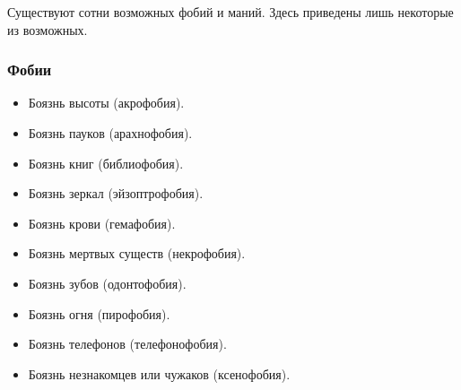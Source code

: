 \documentclass[letterpaper,twocolumn,openany, twoside, 11pt, usenames]{cocbook}
\begin{document}
\begin{fullcocpaperbox}{}{}
  Существуют сотни возможных фобий и маний. Здесь приведены лишь некоторые из возможных.
  \begin{multicols}{2}
  \subsubsection*{Фобии}
  \begin{itemize}[leftmargin=4mm]
  \item Боязнь высоты (акрофобия).
  \item Боязнь пауков (арахнофобия).
  \item Боязнь книг (библиофобия).
  \item Боязнь зеркал (эйзоптрофобия).
  \item Боязнь крови (гемафобия).
  \item Боязнь мертвых существ (некрофобия).
  \item Боязнь зубов (одонтофобия).
  \item Боязнь огня (пирофобия).
  \item Боязнь телефонов (телефонофобия).
  \item Боязнь незнакомцев или чужаков (ксенофобия).
\end{itemize}
  \bigbreak
  \bigbreak
  \bigbreak  \bigbreak
  \bigbreak
  \bigbreak

\end{multicols}
\end{fullcocpaperbox}
\end{document}
